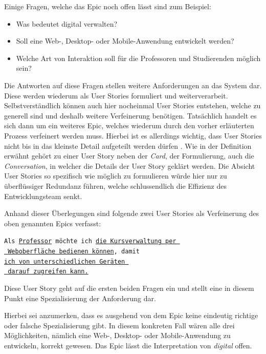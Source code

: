 \documentclass[acmtog]{acmart}
\begin{document}
Einige Fragen, welche das Epic noch offen lässt sind zum Beispiel:
\begin{itemize}
	\item Was bedeutet digital verwalten?
	\item Soll eine Web-, Desktop- oder Mobile-Anwendung entwickelt werden?
	\item Welche Art von Interaktion soll für die Professoren und Studierenden möglich sein?
\end{itemize}

Die Antworten auf diese Fragen stellen weitere Anforderungen an das System dar.
Diese werden wiederum als User Stories formuliert und weiterverarbeit.
Selbstverständlich können auch hier nocheinmal User Stories entstehen, welche
zu generell sind und deshalb weitere Verfeinerung benötigen.
Tatsächlich handelt es sich dann um ein weiteres Epic, welches wiederum durch den
vorher erläuterten Prozess verfeinert werden muss.
Hierbei ist es allerdings wichtig, dass User Stories nicht bis in das kleinste Detail
aufgeteilt werden dürfen \cite[p. 6]{cohn_user_2004}.
Wie in der Definition erwähnt gehört zu einer User Story neben der \emph{Card}, der Formulierung,
auch die \emph{Conversation}, in welcher die Details der User Story geklärt werden.
Die Absicht User Stories so spezifisch wie möglich zu formulieren würde hier nur zu überflüssiger
Redundanz führen, welche schlussendlich die Effizienz des Entwicklungsteam senkt.

Anhand dieser Überlegungen sind folgende zwei User Stories als Verfeinerung des oben genannten Epics verfasst:

\vspace{1em}
\texttt{Als \underline{Professor} möchte ich \underline{die Kursverwaltung per }\\
	\hspace*{2em} \underline{ Weboberfläche bedienen können}, damit\\
	\hspace*{6em} \underline{ich von unterschiedlichen Geräten }\\
	\hspace*{14em} \underline{ darauf zugreifen kann.}}
\vspace{1em}

Diese User Story geht auf die ersten beiden Fragen ein und stellt eine in diesem Punkt
eine Spezialisierung der Anforderung dar.

Hierbei sei anzumerken, dass es ausgehend von dem Epic keine eindeutig richtige oder
falsche Spezialisierung gibt.
In diesem konkreten Fall wären alle drei Möglichkeiten,
nämlich eine Web-, Desktop- oder Mobile-Anwendung zu entwickeln, korrekt gewesen.
Das Epic lässt die Interpretation von \emph{digital} offen.
\end{document}
